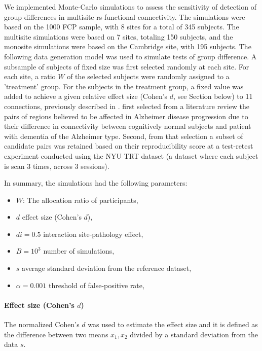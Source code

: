 \documentclass[authoryear]{elsarticle}
\begin{document}
We implemented Monte-Carlo simulations to assess the sensitivity of detection of group differences in multisite rs-functional connectivity. The simulations were based on the 1000 FCP sample, with 8 sites for a total of 345 subjects. The multisite simulations were based on 7 sites, totaling 150 subjects, and the monosite simulations were based on the Cambridge site, with 195 subjects. The following data generation model was used to simulate tests of group difference. A subsample of subjects of fixed size was first selected randomly at each site. For each site, a ratio $W$ of the selected subjects were randomly assigned to a 'treatment' group. For the subjects in the treatment group, a fixed value was added to achieve a given relative effect size (Cohen's $d$, see Section below) to 11 connections, previously described in \cite{Orban2015}. \cite{Orban2015} first selected from a literature review the pairs of regions believed to be affected in Alzheimer disease progression due to their difference in connectivity between cognitively normal subjects and patient with dementia of the Alzheimer type. Second, from that selection a subset of candidate pairs was retained based on their reproducibility score at a test-retest experiment conducted using the NYU TRT dataset \citep{Zuo2010} (a dataset where each subject is scan 3 times, across 3 sessions).  

In summary, the simulations had the following parameters:

\begin{itemize}
 \item $W$: The allocation ratio of participants,
 \item $d$ effect size (Cohen’s $d$),
 \item $di=0.5$ interaction site-pathology effect,
 \item $B=10^3$ number of simulations,
 \item $s$ average standard deviation from the reference dataset,
 \item $\alpha=0.001$ threshold of false-positive rate,
\end{itemize}


\paragraph{Effect size (Cohen's $d$)}
The normalized Cohen's $d$ was used to estimate the effect size and it is defined as the difference between two means $\bar{x_{1}},\bar{x_{2}}$ divided by a standard deviation from the data $s$.
\end{document}
